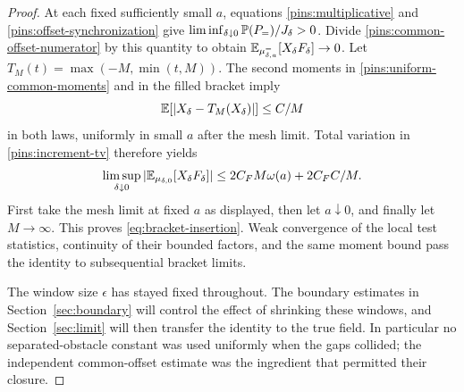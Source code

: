 \begin{proof}
At each fixed sufficiently small $a$, equations
\eqref{pins:multiplicative} and \eqref{pins:offset-synchronization}
give $\liminf_{\delta\downarrow0}\mathbb P(P_=)/J_\delta>0$.
Divide \eqref{pins:common-offset-numerator} by this quantity to obtain
$\mathbb E_{\mu_{\delta,a}^{=}}[X_\delta F_\delta]\to0$.
Let $T_M(t)=\max(-M,\min(t,M))$.  The second moments in
\eqref{pins:uniform-common-moments} and in the filled bracket imply
\[
 \mathbb E[|X_\delta-T_M(X_\delta)|]\le C/M
\]
in both laws, uniformly in small $a$ after the mesh limit.  Total
variation in \eqref{pins:increment-tv} therefore yields
\[
 \limsup_{\delta\downarrow0}
       |\mathbb E_{\mu_{\delta,0}}[X_\delta F_\delta]|
 \le 2C_F M\omega(a)+2C_F C/M.
\]
First take the mesh limit at fixed $a$ as displayed, then let
$a\downarrow0$, and finally let $M\to\infty$.  This proves
\eqref{eq:bracket-insertion}.  Weak convergence of the local test
statistics, continuity of their bounded factors, and the same moment
bound pass the identity to subsequential bracket limits.

The window size $\epsilon$ has stayed fixed throughout.  The boundary
estimates in Section~\ref{sec:boundary} will control the effect of
shrinking these windows, and Section~\ref{sec:limit} will then transfer
the identity to the true field.
In particular no separated-obstacle constant was used uniformly when
the gaps collided; the independent common-offset estimate was the
ingredient that permitted their closure.
\end{proof}
